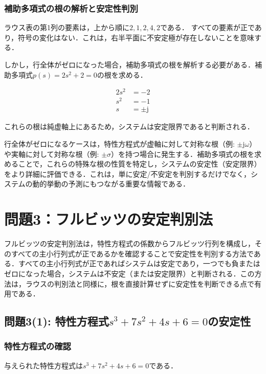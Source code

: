 \documentclass[11pt,a4paper]{ltjsarticle}
\begin{document}
\subsubsection{補助多項式の根の解析と安定性判別}

ラウス表の第1列の要素は，上から順に$2, 1, 2, 4, 2$である．
すべての要素が正であり，符号の変化はない．これは，右半平面に不安定極が存在しないことを意味する．

しかし，行全体がゼロになった場合，補助多項式の根を解析する必要がある．補助多項式$p(s) = 2s^2 + 2 = 0$の根を求める．

\begin{align}
2s^2 &= -2 \\
s^2 &= -1 \\
s &= \pm \mathrm{j}
\end{align}

これらの根は純虚軸上にあるため，システムは安定限界であると判断される．

行全体がゼロになるケースは，特性方程式が虚軸に対して対称な根（例: $\pm \mathrm{j}\omega$）や実軸に対して対称な根（例: $\pm \sigma$）を持つ場合に発生する．補助多項式の根を求めることで，これらの特殊な根の性質を特定し，システムの安定性（安定限界）をより詳細に評価できる．これは，単に安定/不安定を判別するだけでなく，システムの動的挙動の予測にもつながる重要な情報である．

\section{問題3：フルビッツの安定判別法}

フルビッツの安定判別法は，特性方程式の係数からフルビッツ行列を構成し，そのすべての主小行列式が正であるかを確認することで安定性を判別する方法である．すべての主小行列式が正であればシステムは安定であり，一つでも負またはゼロになった場合，システムは不安定（または安定限界）と判断される．この方法は，ラウスの判別法と同様に，根を直接計算せずに安定性を判断できる点で有用である．

\subsection{問題3(1): 特性方程式$s^3+7s^2+4s+6=0$の安定性}

\subsubsection{特性方程式の確認}

与えられた特性方程式は$s^3+7s^2+4s+6=0$である．
\end{document}
